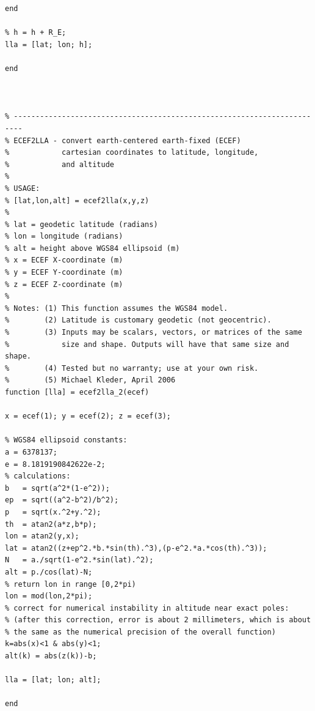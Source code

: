 \documentclass[conf]{new-aiaa}
\begin{document}
\begin{lstlisting}
end 

% h = h + R_E; 
lla = [lat; lon; h]; 

end 



% ------------------------------------------------------------------------
% ECEF2LLA - convert earth-centered earth-fixed (ECEF)
%            cartesian coordinates to latitude, longitude,
%            and altitude
%
% USAGE:
% [lat,lon,alt] = ecef2lla(x,y,z)
%
% lat = geodetic latitude (radians)
% lon = longitude (radians)
% alt = height above WGS84 ellipsoid (m)
% x = ECEF X-coordinate (m)
% y = ECEF Y-coordinate (m)
% z = ECEF Z-coordinate (m)
%
% Notes: (1) This function assumes the WGS84 model.
%        (2) Latitude is customary geodetic (not geocentric).
%        (3) Inputs may be scalars, vectors, or matrices of the same
%            size and shape. Outputs will have that same size and shape.
%        (4) Tested but no warranty; use at your own risk.
%        (5) Michael Kleder, April 2006
function [lla] = ecef2lla_2(ecef)

x = ecef(1); y = ecef(2); z = ecef(3); 

% WGS84 ellipsoid constants:
a = 6378137;
e = 8.1819190842622e-2;
% calculations:
b   = sqrt(a^2*(1-e^2));
ep  = sqrt((a^2-b^2)/b^2);
p   = sqrt(x.^2+y.^2);
th  = atan2(a*z,b*p);
lon = atan2(y,x);
lat = atan2((z+ep^2.*b.*sin(th).^3),(p-e^2.*a.*cos(th).^3));
N   = a./sqrt(1-e^2.*sin(lat).^2);
alt = p./cos(lat)-N;
% return lon in range [0,2*pi)
lon = mod(lon,2*pi);
% correct for numerical instability in altitude near exact poles:
% (after this correction, error is about 2 millimeters, which is about
% the same as the numerical precision of the overall function)
k=abs(x)<1 & abs(y)<1;
alt(k) = abs(z(k))-b;

lla = [lat; lon; alt]; 

end 



	
\end{lstlisting}






% 
\end{document}
